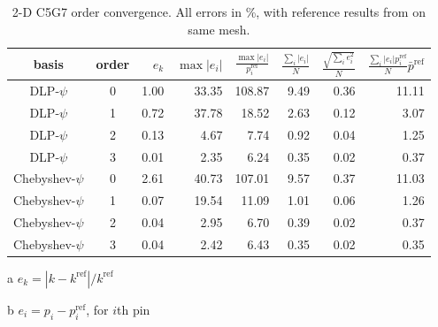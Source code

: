 \begin{table}[ht] 
 \begin{center} 
 
  \begin{threeparttable}
 \begin{tabular}{ccrrrrrr} 
 \toprule 
 basis & order & $e_k$\tnote{a}   & $\max |e_i|$\tnote{b}  & $ \frac{\max |e_i|}{p^{\text{ref}}_i} $  
   & $\frac{\sum_i |e_i|}{ N}$   &  $\frac{\sqrt{\sum_{i} e_{i}^2}}{N}$   
     & $ \frac{\sum_i |e_i|p^{\text{ref}}_i}{N} \bar{p}^{\text{ref}}$    \\
 \midrule 
DLP-$\psi$ &    0  &     1.00   &    33.35   &   108.87   &     9.49   &     0.36   &    11.11   \\
DLP-$\psi$  &    1  &     0.72   &    37.78   &    18.52   &     2.63   &     0.12   &     3.07   \\
DLP-$\psi$  &    2  &     0.13   &     4.67   &     7.74   &     0.92   &     0.04   &     1.25   \\
DLP-$\psi$  &    3  &     0.01   &     2.35   &     6.24   &     0.35   &     0.02   &     0.37   \\
 \midrule 
Chebyshev-$\psi$ &    0  &     2.61   &    40.73   &   107.01   &     9.57   &     0.37   &    11.03   \\
Chebyshev-$\psi$ &    1  &     0.07   &    19.54   &    11.09   &     1.01   &     0.06   &     1.26   \\
Chebyshev-$\psi$ &    2  &     0.04   &     2.95   &     6.70   &     0.39   &     0.02   &     0.37   \\
Chebyshev-$\psi$ &    3  &     0.04   &     2.42   &     6.43   &     0.35   &     0.02   &     0.35   \\
 \bottomrule 
 \end{tabular} 
 
 {\footnotesize
 \begin{tablenotes}
   \item[a] $e_k = |k-k^{\text{ref}}|/k^{\text{ref}}$  
   \item[b] $e_i = p_i - p^{\text{ref}}_i$, for $i$th pin
 \end{tablenotes}
 }
 
 \end{threeparttable}
 
 \end{center} 
 
 \caption{2-D C5G7 order convergence.  All errors in \%, with 
          reference results from \Detran on same mesh.} 
 \label{tbl:c5g7_order_convergence} 
\end{table} 

